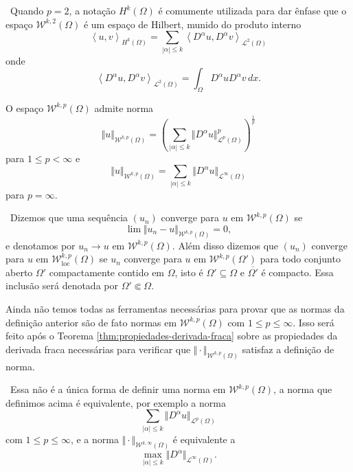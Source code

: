 \documentclass[a4paper, 11pt]{book}
\theoremstyle{definition}
\newcommand{\obs}{\noindent{\textbf{\textcolor{black}{\sffamily Observação:}}}~}
\newcommand{\cL}{\mathcal{L}}
\newcommand{\cW}{\mathcal{W}}
\newcommand{\esssup}{\mathrm{ess\,sup}\,}
\newcommand{\loc}{\mathrm{loc}}
\begin{document}
\obs Quando $p = 2$, a notação $H^{k}(\Omega)$ é comumente utilizada para dar ênfase que o espaço $\cW^{k,2}(\Omega)$ é um espaço de Hilbert, munido do produto interno
\[
    \left\langle u, v\right\rangle _{H^k(\Omega)} = \sum_{|\alpha| \leqslant k} \left\langle D^\alpha u, D^\alpha v\right\rangle _{\cL^2(\Omega)}
\]
onde
\[
    \left\langle D^\alpha u, D^\alpha v\right\rangle _{\cL^2(\Omega)} = \int_\Omega D^\alpha u D^\alpha v \,dx.
\]

\begin{dbox}
    O espaço $\cW^{k,p}(\Omega)$ admite norma
    \[
        \Vert u \Vert_{\cW^{k,p}(\Omega)} = \left( \sum_{|\alpha| \leqslant k} \Vert D^\alpha u \Vert_{\cL^p(\Omega)}^p \right)^{\frac{1}{p}}
    \]
    para $1 \leqslant p < \infty$ e 
    \[
        \Vert u \Vert_{\cW^{k,p}(\Omega)} 
        = \sum_{|\alpha| \leqslant k} \Vert D^{\alpha}u \Vert_{\cL^\infty(\Omega)}
    \]
    para $p = \infty$.
\end{dbox}

\obs Dizemos que uma sequência $(u_n)$ converge para $u$ em $\cW^{k,p}(\Omega)$ se
\[
    \lim \Vert u_n - u \Vert_{\cW^{k,p}(\Omega)} = 0,
\]
e denotamos por $u_n \to u \text{ em } \cW^{k,p}(\Omega)$.
Além disso dizemos que $(u_n)$ converge para $u$ em $\cW^{k,p}_\loc(\Omega)$ se $u_n$ converge para $u$ em $\cW^{k,p}(\Omega')$ para todo conjunto aberto $\Omega'$ compactamente contido em $\Omega$, isto é $\Omega' \subseteq \Omega$ e $\overline{\Omega'}$ é compacto. Essa inclusão será denotada por $\Omega' \Subset \Omega$.

Ainda não temos todas as ferramentas necessárias para provar que as normas da definição anterior são de fato normas em $\cW^{k,p}(\Omega)$ com $1 \leqslant p \leqslant \infty$. Isso será feito após o Teorema \ref{thm:propiedades-derivada-fraca} sobre as propiedades da derivada fraca necessárias para verificar que $\Vert \cdot \Vert_{\cW^{k,p}(\Omega)}$ satisfaz a definição de norma.

\obs Essa não é a única forma de definir uma norma em $\cW^{k,p}(\Omega)$, a norma que definimos acima é equivalente, por exemplo a norma
\[
    \sum_{|\alpha| \leqslant k} \Vert D^\alpha u \Vert_{\cL^p(\Omega)}
\]
com $1 \leqslant p \leqslant \infty$, e a norma $\Vert \cdot \Vert_{\cW^{k,\infty}(\Omega)}$ é equivalente a
\[
    \max_{|\alpha|\leqslant k} \Vert D^\alpha \Vert_{\cL^\infty(\Omega)}.
\]
\end{document}
